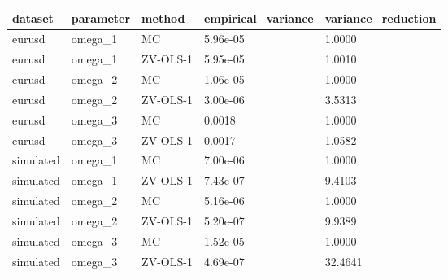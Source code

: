\begin{tabular}{lllll}
\toprule
dataset & parameter & method & empirical\_variance & variance\_reduction \\
\midrule
eurusd & omega\_1 & MC & 5.96e-05 & 1.0000 \\
eurusd & omega\_1 & ZV-OLS-1 & 5.95e-05 & 1.0010 \\
eurusd & omega\_2 & MC & 1.06e-05 & 1.0000 \\
eurusd & omega\_2 & ZV-OLS-1 & 3.00e-06 & 3.5313 \\
eurusd & omega\_3 & MC & 0.0018 & 1.0000 \\
eurusd & omega\_3 & ZV-OLS-1 & 0.0017 & 1.0582 \\
simulated & omega\_1 & MC & 7.00e-06 & 1.0000 \\
simulated & omega\_1 & ZV-OLS-1 & 7.43e-07 & 9.4103 \\
simulated & omega\_2 & MC & 5.16e-06 & 1.0000 \\
simulated & omega\_2 & ZV-OLS-1 & 5.20e-07 & 9.9389 \\
simulated & omega\_3 & MC & 1.52e-05 & 1.0000 \\
simulated & omega\_3 & ZV-OLS-1 & 4.69e-07 & 32.4641 \\
\bottomrule
\end{tabular}
